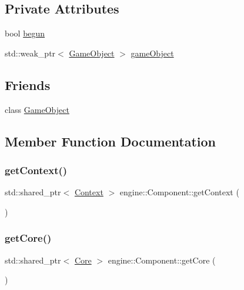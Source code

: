 \subsection*{Private Attributes}
\begin{DoxyCompactItemize}
\item 
bool \mbox{\hyperlink{classengine_1_1_component_ada25c7d14b898ac3802906b612f65ff9}{begun}}
\item 
std\+::weak\+\_\+ptr$<$ \mbox{\hyperlink{classengine_1_1_game_object}{Game\+Object}} $>$ \mbox{\hyperlink{classengine_1_1_component_a7466d237293a5911f53227a9ec036b71}{game\+Object}}
\end{DoxyCompactItemize}
\subsection*{Friends}
\begin{DoxyCompactItemize}
\item 
class \mbox{\hyperlink{classengine_1_1_component_a00df87c957d8f7ee0fc51f07a0542f4a}{Game\+Object}}
\end{DoxyCompactItemize}


\subsection{Member Function Documentation}
\mbox{\label{classengine_1_1_component_aa96e31ff8a0fbb9273a008c856032176}} 
\subsubsection{\texorpdfstring{get\+Context()}{getContext()}}
{\footnotesize\ttfamily std\+::shared\+\_\+ptr$<$ \mbox{\hyperlink{classengine_1_1_context}{Context}} $>$ engine\+::\+Component\+::get\+Context (\begin{DoxyParamCaption}{ }\end{DoxyParamCaption})}

\mbox{\label{classengine_1_1_component_a1018f75dbd70ce43e2b1b9d64e6c0dab}} 
\subsubsection{\texorpdfstring{get\+Core()}{getCore()}}
{\footnotesize\ttfamily std\+::shared\+\_\+ptr$<$ \mbox{\hyperlink{classengine_1_1_core}{Core}} $>$ engine\+::\+Component\+::get\+Core (\begin{DoxyParamCaption}{ }\end{DoxyParamCaption})}

